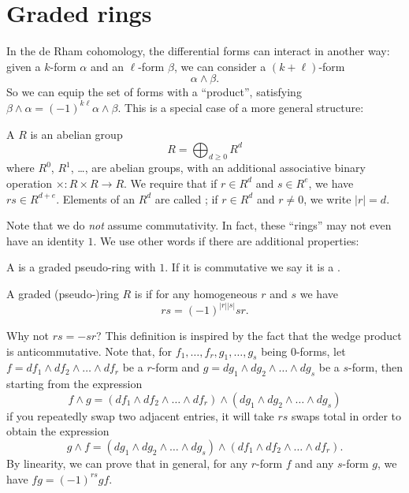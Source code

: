 \section{Graded rings}
In the de Rham cohomology, the differential forms can interact in another way:
given a $k$-form $\alpha$ and an $\ell$-form $\beta$, we can consider
a $(k+\ell)$-form
\[ \alpha \wedge \beta. \]
So we can equip the set of forms with a ``product'', satisfying
$\beta \wedge \alpha = (-1)^{k\ell} \alpha \wedge \beta$.
This is a special case of a more general structure:

\begin{definition}
	A  $R$ is an abelian group
	\[ R = \bigoplus_{d \ge 0} R^d \]
	where $R^0$, $R^1$, \dots, are abelian groups,
	with an additional associative binary operation $\times \colon R \times R \to R$.
	We require that if $r \in R^d$ and $s \in R^e$, we have $rs \in R^{d+e}$.
	Elements of an $R^d$ are called ;
	if $r \in R^d$ and $r \neq 0$, we write $|r| = d$.
\end{definition}
Note that we do \emph{not} assume commutativity.
In fact, these ``rings'' may not even have an identity $1$.
We use other words if there are additional properties:
\begin{definition}
	\label{def:graded_ring}
	A  is a graded pseudo-ring with $1$.
	If it is commutative we say it is a .
\end{definition}
\begin{definition}
	A graded (pseudo-)ring $R$ is  if
	for any homogeneous $r$ and $s$ we have
	\[ rs = (-1)^{|r| |s|} sr. \]
\end{definition}

\begin{remark}
	Why not $rs = -sr$? This definition is inspired by the fact that the wedge product is
	anticommutative. Note that, for $f_1, \dots, f_r, g_1, \dots, g_s$ being $0$-forms,
	let $f = df_1 \wedge df_2 \wedge \dots \wedge df_r$ be a $r$-form and
	$g = dg_1 \wedge dg_2 \wedge \dots \wedge dg_s$ be a $s$-form,
	then starting from the expression
	\[ f \wedge g = (df_1 \wedge df_2 \wedge \dots \wedge df_r) \wedge
	(dg_1 \wedge dg_2 \wedge \dots \wedge dg_s) \]
	if you repeatedly swap two adjacent entries, it will take $rs$ swaps total in order to obtain
	the expression
	\[ g \wedge f = (dg_1 \wedge dg_2 \wedge \dots \wedge dg_s) \wedge
	(df_1 \wedge df_2 \wedge \dots \wedge df_r). \]
	By linearity, we can prove that in general, for any $r$-form $f$ and any $s$-form $g$,
	we have $fg = (-1)^{rs} gf$.
\end{remark}

